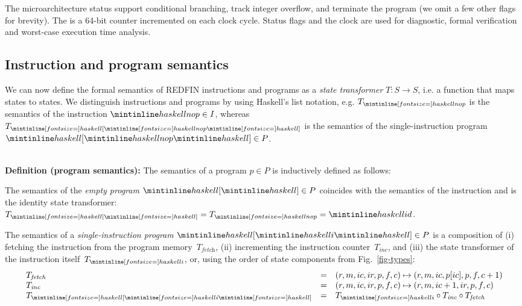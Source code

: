 The microarchitecture status  support conditional branching, track
integer overflow, and terminate the program (we omit a few other flags for
brevity).
The  is a 64-bit counter
incremented on each clock cycle. Status flags and the clock are used for
diagnostic, formal verification and worst-case execution time analysis.

\subsection{Instruction and program semantics}

We can now define the formal semantics of REDFIN instructions and programs as a
\emph{state transformer} $T : S \rightarrow S$, i.e. a function that maps
states to states. We distinguish instructions and programs by using
Haskell's list notation, e.g. $T_{\subhs{nop}}$ is the semantics of the
instruction $\hs{nop} \in I$, whereas $T_{\subhs{[}\subhs{nop}\subhs{]}}$ is the
semantics of the single-instruction program $\hs{[}\hs{nop}\hs{]} \in P$.


\noindent\hrulefill~\\

\noindent
\textbf{Definition (program semantics):} The semantics of a program $p \in P$
is inductively defined as follows:

    The semantics of the \emph{empty program} $\hs{[}\hs{]} \in P$ coincides with
    the semantics of the instruction  and is the identity state transformer:
    $T_{\subhs{[}\subhs{]}} = T_{\subhs{nop}} = \hs{id}$.

    The semantics of a \emph{single-instruction program} $\hs{[}\hs{i}\hs{]} \in P$
    is a composition of (i) fetching the instruction from
    the program memory~$T_\textit{fetch}$, (ii) incrementing the
    instruction counter~$T_\textit{inc}$, and (iii) the state transformer
    of the instruction itself~$T_{\subhs{i}}$, or, using the order of state
    components from Fig.~\ref{fig-types}:
    \[
    \begin{array}{lcl}
    T_\textit{fetch} & = & (r, m, ic, ir, p, f, c) \mapsto (r, m, ic, p[ic], p, f, c + 1)\\
    T_\textit{inc} & = & (r, m, ic, ir, p, f, c) \mapsto (r, m, ic + 1, ir, p, f, c)\\
    T_{\subhs{[}\subhs{i}\subhs{]}} & = & T_{\subhs{i}} \circ T_\textit{inc} \circ T_\textit{fetch}\\
    \end{array}
    \]

